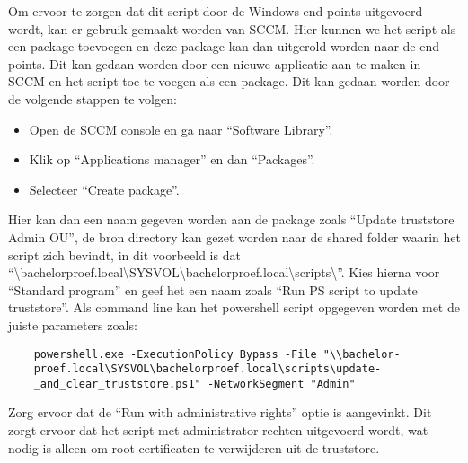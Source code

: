 Om ervoor te zorgen dat dit script door de Windows end-points uitgevoerd wordt, kan er gebruik gemaakt worden van SCCM. Hier kunnen we het script als een package toevoegen en deze package kan dan uitgerold worden naar de end-points. Dit kan gedaan worden door een nieuwe applicatie aan te maken in SCCM en het script toe te voegen als een package.
Dit kan gedaan worden door de volgende stappen te volgen:
\begin{itemize}
    \item Open de SCCM console en ga naar ``Software Library''.
    \item Klik op ``Applications manager'' en dan ``Packages''.
    \item Selecteer ``Create package''.
\end{itemize}

Hier kan dan een naam gegeven worden aan de package zoals ``Update truststore Admin OU'', de bron directory kan gezet worden naar de shared folder waarin het script zich bevindt, in dit voorbeeld is dat \\
 ``\textbackslash bachelorproef.local\textbackslash SYSVOL\textbackslash bachelorproef.local\textbackslash scripts\textbackslash''.
Kies hierna voor ``Standard program'' en geef het een naam zoals ``Run PS script to update truststore''. Als command line kan het powershell script opgegeven worden met de juiste parameters zoals:
\begin{verbatim}
    powershell.exe -ExecutionPolicy Bypass -File "\\bachelor-
    proef.local\SYSVOL\bachelorproef.local\scripts\update-
    _and_clear_truststore.ps1" -NetworkSegment "Admin"
\end{verbatim}

Zorg ervoor dat de ``Run with administrative rights'' optie is aangevinkt. Dit zorgt ervoor dat het script met administrator rechten uitgevoerd wordt, wat nodig is alleen om root certificaten te verwijderen uit de truststore. \\

